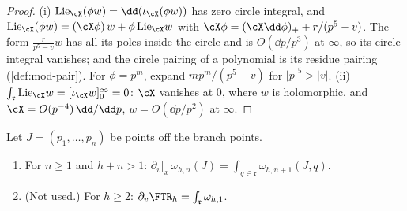 \begin{proof}
(i) $\mathrm{Lie}_{\cX}(\phi w)=\dd(\iota_{\cX}(\phi w))$ has zero circle integral, and $\mathrm{Lie}_{\cX}(\phi w)=(\cX\phi)\,w+\phi\,\mathrm{Lie}_{\cX}w$ with $\cX\phi=(\cX\dd\phi)_++r/(p^5-v)$. The form $\frac{r}{p^5-v}w$ has all its poles inside the circle and is $O(\dd p/p^3)$ at $\infty$, so its circle integral vanishes; and the circle pairing of a polynomial is its residue pairing (\cref{def:mod-pair}). For $\phi=p^m$, expand $mp^m/(p^5-v)$ for $|p|^5>|v|$. (ii) $\int_{\mathfrak r}\mathrm{Lie}_{\cX}w=[\iota_{\cX}w]_0^\infty=0$: $\cX$ vanishes at $0$, where $w$ is holomorphic, and $\cX=O(p^{-4})\,\dd/\dd p$, $w=O(\dd p/p^2)$ at $\infty$.
\end{proof}

\begin{thm}
\label{thm:mod-var}
Let $J=(p_1,\dots,p_n)$ be points off the branch points.
\begin{enumerate}
\item For $n\geq 1$ and $h+n>1$: $\partial_v|_x\,\omega_{h,n}(J)=\int_{q\in\mathfrak r}\omega_{h,n+1}(J,q)$.
\item (Not used.) For $h\geq 2$: $\partial_v\FTR_h=\int_{\mathfrak r}\omega_{h,1}$.
\end{enumerate}
\end{thm}

